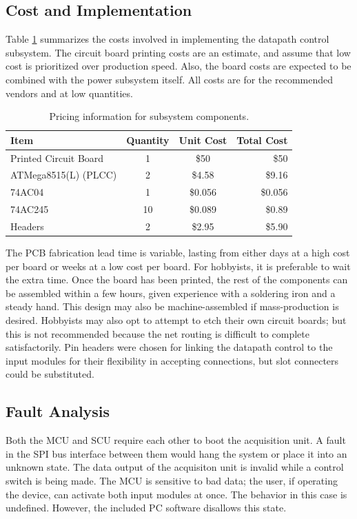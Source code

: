 \subsection{Cost and Implementation}

Table \ref{tab:datap costs} summarizes the costs involved in implementing the 
datapath control subsystem. The circuit board printing costs are an estimate, 
and assume that low cost is prioritized over production speed. Also, the board
costs are expected to be combined with the power subsystem itself. All costs 
are for the recommended vendors and at low quantities.

\begin{table}[hbp!]
\caption{Pricing information for subsystem components\cite{web:batchpcb}\cite{web:jameco_atmel}\cite{web:jameco_inv}\cite{web:sparkfun}.}
\small
\begin{center}
\begin{tabular}{l | c c r}
	Item & Quantity & Unit Cost & Total Cost \\ \hline
	Printed Circuit Board & 1 & \$50 & \$50 \\
	ATMega8515(L) (PLCC) & 2 & \$4.58 & \$9.16 \\
	74AC04 & 1 & \$0.056 & \$0.056\\
	74AC245  & 10 & \$0.089 & \$0.89\\
	Headers & 2 & \$2.95 &  \$5.90
\end{tabular}
\end{center}
\label{tab:datap costs}
\end{table}

The PCB fabrication lead time is variable, lasting from either days at a high
 cost per board or weeks at a low cost per board. For hobbyists, it is 
preferable to wait the extra time. Once the board has been printed, the rest of
 the components can be assembled within a few hours, given experience with a 
soldering iron and a steady hand. This design may also be machine-assembled if 
mass-production is desired. Hobbyists may also opt to attempt to etch their own
 circuit boards; but this is not recommended because the net routing is 
difficult to complete satisfactorily. Pin headers were chosen for linking the datapath control to the input modules for their flexibility in accepting connections, but slot connecters could be substituted.

\subsection{Fault Analysis}
Both the MCU and SCU require each other to boot the acquisition unit. A fault 
in the SPI bus interface between them would hang the system or place it into an
unknown state. The data output of the acquisiton unit is invalid while a control
switch is being made. The MCU is sensitive to bad data; the user, if operating
the device, can activate both input modules at once. The behavior in this case
is undefined. However, the included PC software disallows this state.

